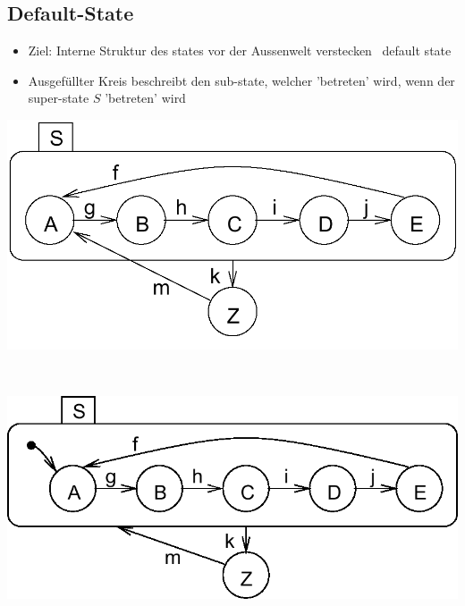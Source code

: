 \subsection{Default-State}

\begin{itemize}
    \item Ziel: Interne Struktur des states vor der Aussenwelt verstecken \textrightarrow\ default state
    \item Ausgefüllter Kreis beschreibt den sub-state, welcher 'betreten' wird, wenn der super-state $S$ 'betreten' wird %
\end{itemize}

\vspace{0.2cm}

\begin{minipage}[c]{0.41\columnwidth}
    \includegraphics[width=\columnwidth]{images/statechart_hierarchie.png}
\end{minipage}
\hfill
\begin{minipage}[c]{0.05\columnwidth}
    \begin{center}
        \huge \textrightarrow\
    \end{center}
\end{minipage}
\hfill
\begin{minipage}[c]{0.41\columnwidth}
    \includegraphics[width=\columnwidth]{images/statechart_default_state.png}
\end{minipage}


